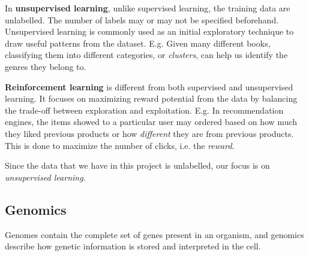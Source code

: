 In \textbf{unsupervised learning}, unlike supervised learning, the training data are unlabelled. The number of labels may or may not be specified beforehand. Unsupervised learning is commonly used as an initial exploratory technique to draw useful patterns from the dataset. E.g. Given many different books, classifying them into different categories, or \textit{clusters}, can help us identify the genres they belong to. 

\textbf{Reinforcement learning} is different from both supervised and unsupervised learning. It focuses on maximizing reward potential from the data by balancing the trade-off between exploration and exploitation. E.g. In recommendation engines, the items showed to a particular user may ordered based on how much they liked previous products or how \textit{different} they are from previous products. This is done to maximize the number of clicks, i.e. the \textit{reward}.

Since the data that we have in this project is unlabelled, our focus is on \textit{unsupervised learning}.

\subsection{Genomics}

Genomes contain the complete set of genes present in an organism, and genomics describe how genetic information is stored and interpreted in the cell.

